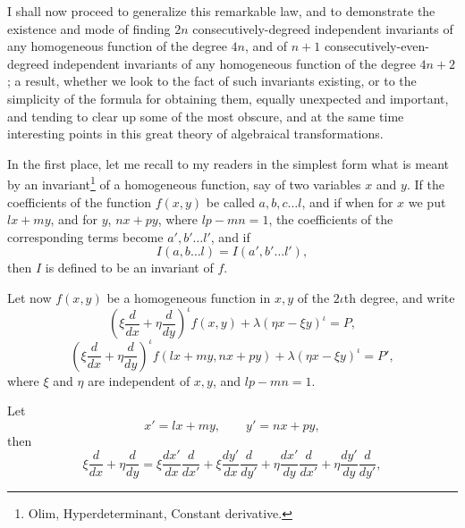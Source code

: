 \documentclass[11pt]{article}
\begin{document}
{{I shall now proceed to generalize this remarkable law, and to demonstrate the existence and mode of finding $2n$ consecutively-degreed independent invariants of any homogeneous function of the degree $4n$, and of $n+1$ consecutively-even-degreed independent invariants of any homogeneous function of the degree $4n+2$; a result, whether we look to the fact of such invariants existing, or to the simplicity of the formula for obtaining them, equally unexpected and important, and tending to clear up some of the most obscure, and at the same time interesting points in this great theory of algebraical transformations.

In the first place, let me recall to my readers in the simplest form what is meant by an invariant\footnote{Olim, Hyperdeterminant, Constant derivative.} of a homogeneous function, say of two variables $x$ and $y$. If the coefficients of the function $f(x,y)$ be called $a,b,c\ldots l$, and if when for $x$ we put $lx+my$, and for $y$, $nx+py$, where $lp-mn=1$, the coefficients of the corresponding terms become $a',b'\ldots l'$, and if
\[
I(a,b\ldots l)=I(a',b'\ldots l'),
\]
then $I$ is defined to be an invariant of $f$.

Let now $f(x,y)$ be a homogeneous function in $x,y$ of the $2\iota$th degree, and write
\[
\left(\xi\frac{d}{dx}+\eta\frac{d}{dy}\right)^\iota f(x,y)+\lambda(\eta x-\xi y)^\iota=P,
\]
\[
\left(\xi\frac{d}{dx}+\eta\frac{d}{dy}\right)^\iota f(lx+my,nx+py)+\lambda(\eta x-\xi y)^\iota=P',
\]
where $\xi$ and $\eta$ are independent of $x,y$, and $lp-mn=1$.

Let
\[
x'=lx+my,\qquad y'=nx+py,
\]
then
\[
\xi\frac{d}{dx}+\eta\frac{d}{dy}
=\xi\frac{dx'}{dx}\frac{d}{dx'}+\xi\frac{dy'}{dx}\frac{d}{dy'}
+\eta\frac{dx'}{dy}\frac{d}{dx'}+\eta\frac{dy'}{dy}\frac{d}{dy'},
\]

}}
\end{document}
